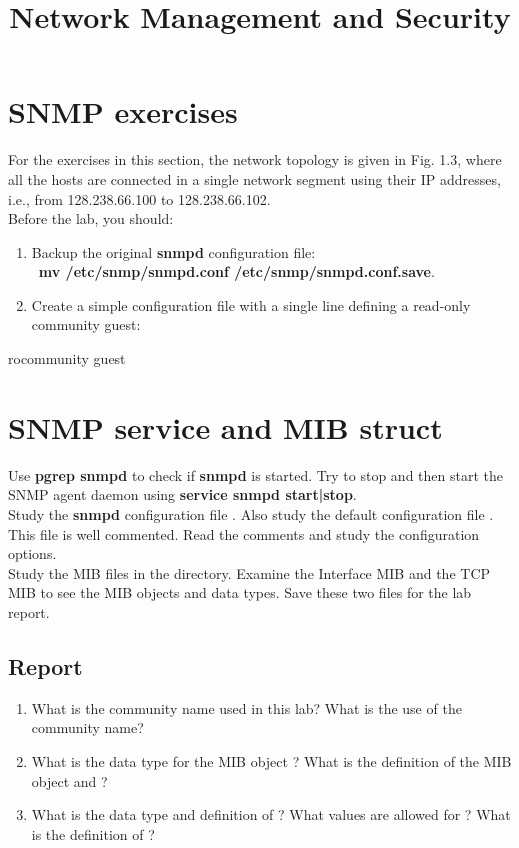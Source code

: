 \documentclass{../UTNetLab}
\title{Network Management and Security}
\author{%
    Dr. Ahmad Khonsari - \FR{دکتر احمد خونساری}\\
    \href{mailto:a_khonsari@ut.ac.ir}{a\_khonsari@ut.ac.ir}\\
    \vskip 1.5em%
    Amir Haji Ali Khamseh'i - \FR{امیر حاجی‌علی‌خمسه‌ء}\\
    \href{mailto:khamse@ut.ac.ir}{khamse@ut.ac.ir}\\
    \vskip 1.5em%
    \href{mailto:m.borhani@ut.ac.ir}{Muhammad Borhani} - \FR{محمد برهانی}\\
    \href{mailto:a.a.khordadi@ut.ac.ir}{Amirahmad Khordadi} - \FR{امیراحمد خردادی}\\
    \href{mailto:sina\_kashipazha@ut.ac.ir}{Sina Kashi pazha} - \FR{سینا کاشی‌پزها}
}
\begin{document}
	\maketitle

\section*{SNMP exercises}
	For the exercises in this section, the network topology is given in Fig. 1.3, where all the hosts are connected in a single network segment using their IP addresses, i.e., from 128.238.66.100 to 128.238.66.102.\\
	Before the lab, you should:
	\begin{enumerate}
		\item Backup the original \textbf{snmpd} configuration file:\\
		\, \textbf{mv /etc/snmp/snmpd.conf /etc/snmp/snmpd.conf.save}.
		\item Create a simple configuration file  with a single line defining a read-only community guest:
	\end{enumerate}
	\begin{grayverbatim}
		rocommunity guest
	\end{grayverbatim}

\section{SNMP service and MIB struct}
	Use \textbf{pgrep snmpd} to check if \textbf{snmpd} is started. Try to stop and then start the SNMP agent daemon using \textbf{service snmpd start|stop}.\\
	Study the \textbf{snmpd} configuration file . Also study the default configuration file . This file is well commented. Read the comments and study the configuration options.\\
	Study the MIB files in the  directory. Examine the Interface MIB  and the TCP MIB  to see the MIB objects and data types. Save these two files for the lab report.

	\subsection*{Report}
	\begin{enumerate}
		\item What is the community name used in this lab? What is the use of the
		community name?
		\item What is the data type for the MIB object ? What is the definition of the MIB object  and ?
		\item What is the data type and definition of ? What values are allowed for ? What is the definition of ?
	\end{enumerate}
\end{document}
